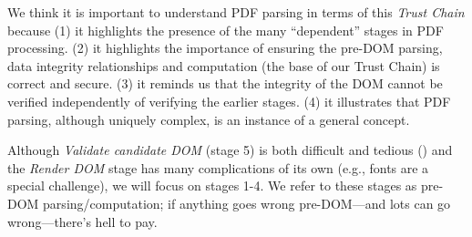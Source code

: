 We think it is important to understand PDF parsing in terms of this
\emph{Trust Chain} because
%
(1) it highlights the presence of the many ``dependent'' stages
in PDF processing.
%
(2) it highlights the importance of ensuring the pre-DOM parsing, data integrity relationships and
computation (the base of our Trust Chain) is correct and secure.
%
(3) it reminds us that the integrity of the DOM cannot be verified
independently of verifying the earlier stages.
%
(4) it illustrates that PDF parsing, although uniquely complex, is an instance of
a general concept.

Although \emph{Validate candidate DOM} (stage 5) is both difficult and tedious
()
and the \emph{Render DOM} stage has many complications of its own (e.g., fonts are
a special challenge), we will focus on stages 1-4.
We refer to these stages as pre-DOM parsing/computation; if anything
goes wrong pre-DOM---and lots can go wrong---there's hell to pay.
